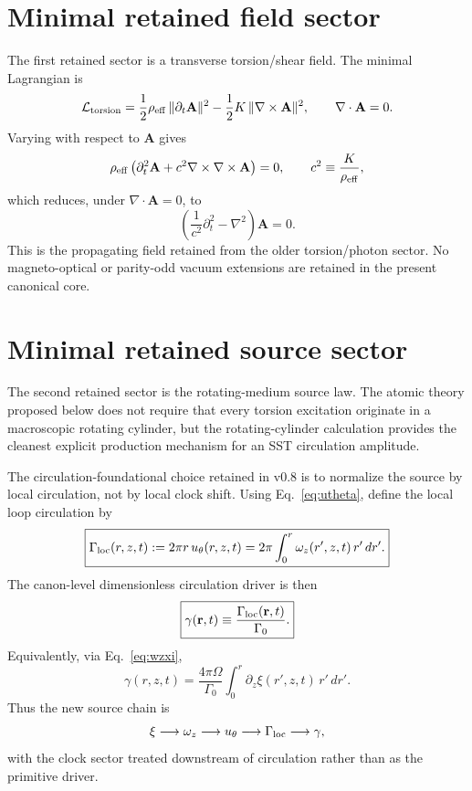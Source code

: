 \documentclass[11pt,a4paper]{article}
\begin{document}
\section{Minimal retained field sector}
The first retained sector is a transverse torsion/shear field. The minimal Lagrangian is
\begin{equation}
\label{eq:Ltorsion}
\mathcal{L}_{\rm torsion}
=
\frac12\rho_{\rm eff}\,\lVert \partial_t \mathbf{A}\rVert^2
-
\frac12 K\,\lVert \nabla\times\mathbf{A}\rVert^2,
\qquad
\nabla\cdot\mathbf{A}=0.
\end{equation}
Varying with respect to $\mathbf{A}$ gives
\begin{equation}
\label{eq:Awave-pre}
\rho_{\rm eff}\left(\partial_t^2\mathbf{A}+c^2\nabla\times\nabla\times\mathbf{A}\right)=0,
\qquad
c^2\equiv \frac{K}{\rho_{\rm eff}},
\end{equation}
which reduces, under $\nabla\cdot\mathbf{A}=0$, to
\begin{equation}
\label{eq:Awave}
\boxed{
\left(\frac{1}{c^2}\partial_t^2-\nabla^2\right)\mathbf{A}=0.
}
\end{equation}
This is the propagating field retained from the older torsion/photon sector. No magneto-optical or parity-odd vacuum extensions are retained in the present canonical core.

\section{Minimal retained source sector}
The second retained sector is the rotating-medium source law. The atomic theory proposed below does not require that every torsion excitation originate in a macroscopic rotating cylinder, but the rotating-cylinder calculation provides the cleanest explicit production mechanism for an SST circulation amplitude.

The circulation-foundational choice retained in v0.8 is to normalize the source by local circulation, not by local clock shift. Using Eq.~\eqref{eq:utheta}, define the local loop circulation by
\begin{equation}
\label{eq:GammaLoc}
\boxed{
\Gamma_{\rm loc}(r,z,t)
:=
2\pi r\,u_\theta(r,z,t)
=
2\pi\int_0^r \omega_z(r',z,t)\,r'\,dr'.
}
\end{equation}
The canon-level dimensionless circulation driver is then
\begin{equation}
\label{eq:gammaDef}
\boxed{
\gamma(\mathbf r,t)
\equiv
\frac{\Gamma_{\rm loc}(\mathbf r,t)}{\Gamma_0}.
}
\end{equation}
Equivalently, via Eq.~\eqref{eq:wzxi},
\begin{equation}
\label{eq:gammaXi}
\gamma(r,z,t)
=
\frac{4\pi\Omega}{\Gamma_0}
\int_0^r \partial_z \xi(r',z,t)\,r'\,dr'.
\end{equation}
Thus the new source chain is
\begin{equation}
\label{eq:source-chain}
\xi \longrightarrow \omega_z \longrightarrow u_\theta \longrightarrow \Gamma_{\rm loc} \longrightarrow \gamma,
\end{equation}
with the clock sector treated downstream of circulation rather than as the primitive driver.
\end{document}
